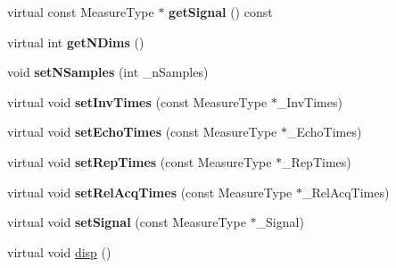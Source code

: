 \begin{DoxyCompactItemize}
\item 
\hypertarget{class_ox_1_1_functions_t1_adf70d696e9da0fcdb45c4a4d02913d6c}{virtual const Measure\-Type $\ast$ {\bfseries get\-Signal} () const }\label{class_ox_1_1_functions_t1_adf70d696e9da0fcdb45c4a4d02913d6c}

\item 
\hypertarget{class_ox_1_1_functions_t1_a4bd8c56786631568dac07ddae165a6b1}{virtual int {\bfseries get\-N\-Dims} ()}\label{class_ox_1_1_functions_t1_a4bd8c56786631568dac07ddae165a6b1}

\item 
\hypertarget{class_ox_1_1_functions_t1_ac817cab2256c8495bc6979bb1fca2688}{void {\bfseries set\-N\-Samples} (int \-\_\-n\-Samples)}\label{class_ox_1_1_functions_t1_ac817cab2256c8495bc6979bb1fca2688}

\item 
\hypertarget{class_ox_1_1_functions_t1_a5a96e27da44213d1b4f4a7e91d8e0347}{virtual void {\bfseries set\-Inv\-Times} (const Measure\-Type $\ast$\-\_\-\-Inv\-Times)}\label{class_ox_1_1_functions_t1_a5a96e27da44213d1b4f4a7e91d8e0347}

\item 
\hypertarget{class_ox_1_1_functions_t1_a3ce890151e04cf3c9649c1e8bed3dcb1}{virtual void {\bfseries set\-Echo\-Times} (const Measure\-Type $\ast$\-\_\-\-Echo\-Times)}\label{class_ox_1_1_functions_t1_a3ce890151e04cf3c9649c1e8bed3dcb1}

\item 
\hypertarget{class_ox_1_1_functions_t1_ad221400dbedf2ac324f0e80105a261fb}{virtual void {\bfseries set\-Rep\-Times} (const Measure\-Type $\ast$\-\_\-\-Rep\-Times)}\label{class_ox_1_1_functions_t1_ad221400dbedf2ac324f0e80105a261fb}

\item 
\hypertarget{class_ox_1_1_functions_t1_a278e7e3d4989fb9305cdc0ec6160f1a8}{virtual void {\bfseries set\-Rel\-Acq\-Times} (const Measure\-Type $\ast$\-\_\-\-Rel\-Acq\-Times)}\label{class_ox_1_1_functions_t1_a278e7e3d4989fb9305cdc0ec6160f1a8}

\item 
\hypertarget{class_ox_1_1_functions_t1_a73bd06989de4d204d8e654c583cd3ce3}{virtual void {\bfseries set\-Signal} (const Measure\-Type $\ast$\-\_\-\-Signal)}\label{class_ox_1_1_functions_t1_a73bd06989de4d204d8e654c583cd3ce3}

\item 
\hypertarget{class_ox_1_1_functions_t1_a21708a9d44f261ba53648c2e6fcdd3a5}{virtual void \hyperlink{class_ox_1_1_functions_t1_a21708a9d44f261ba53648c2e6fcdd3a5}{disp} ()}\label{class_ox_1_1_functions_t1_a21708a9d44f261ba53648c2e6fcdd3a5}


\end{DoxyCompactItemize}
